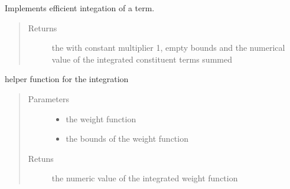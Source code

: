 \documentclass[letterpaper,10pt,english,openany,oneside]{sphinxmanual}
\begin{document}
\begin{fulllineitems}

\begin{fulllineitems}
\label{\detokenize{index:term.Term.integrate}}
Implements efficient integation of a term.
\begin{quote}\begin{description}
\item[{Returns}] \leavevmode
the {\hyperref[\detokenize{index:term.Term}]{}} with constant multiplier 1, empty bounds and the numerical value of the integrated constituent terms summed

\end{description}\end{quote}

\end{fulllineitems}


\end{fulllineitems}


\begin{fulllineitems}
\label{\detokenize{index:term.integrateFromDict}}
helper function for the integration
\begin{quote}\begin{description}
\item[{Parameters}] \leavevmode\begin{itemize}
\item {} 
 \textendash{} the weight function

\item {} 
 \textendash{} the bounds of the weight function

\end{itemize}

\item[{Retuns}] \leavevmode
the numeric value of the integrated weight function

\end{description}\end{quote}

\end{fulllineitems}
\end{document}
